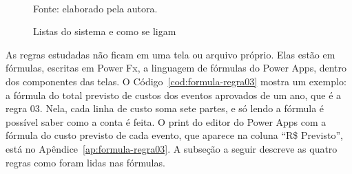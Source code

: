 \begin{figure}[htbp]
\centering
\caption{Listas do sistema e como se ligam}
\label{fig:listas}
\\[2pt]
\footnotesize Fonte: elaborado pela autora.
\end{figure}

As regras estudadas não ficam em uma tela ou arquivo próprio. Elas estão em fórmulas, escritas em Power Fx, a linguagem de fórmulas do Power Apps, dentro dos componentes das telas. O Código~\ref{cod:formula-regra03} mostra um exemplo: a fórmula do total previsto de custos dos eventos aprovados de um ano, que é a regra 03. Nela, cada linha de custo soma sete partes, e só lendo a fórmula é possível saber como a conta é feita. O print do editor do Power Apps com a fórmula do custo previsto de cada evento, que aparece na coluna ``R\$ Previsto'', está no Apêndice~\ref{ap:formula-regra03}. A subseção a seguir descreve as quatro regras como foram lidas nas fórmulas.

